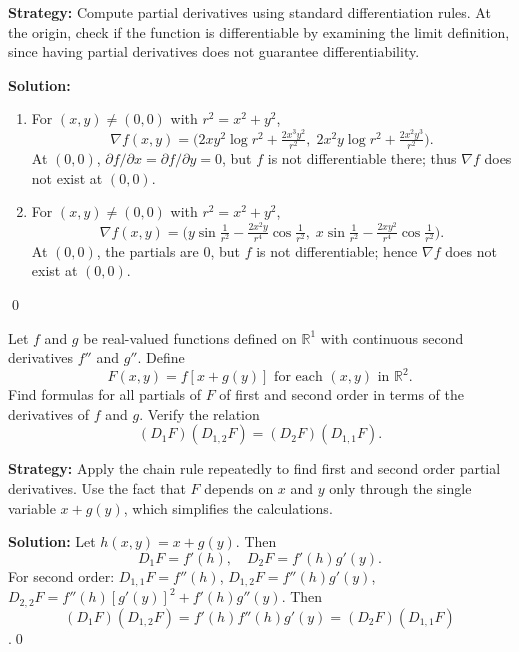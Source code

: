\noindent\textbf{Strategy:} Compute partial derivatives using standard differentiation rules. At the origin, check if the function is differentiable by examining the limit definition, since having partial derivatives does not guarantee differentiability.

\bigskip\noindent\textbf{Solution:}
\begin{enumerate}[label=(\alph*)]
\item For $(x,y)\ne(0,0)$ with $r^2=x^2+y^2$,
\[\nabla f(x,y)=\big(2xy^2\log r^2+\tfrac{2x^3y^2}{r^2},\;2x^2y\log r^2+\tfrac{2x^2y^3}{r^2}\big).\]
At $(0,0)$, $\partial f/\partial x=\partial f/\partial y=0$, but $f$ is not differentiable there; thus $\nabla f$ does not exist at $(0,0)$.
\item For $(x,y)\ne(0,0)$ with $r^2=x^2+y^2$,
\[\nabla f(x,y)=\big(y\sin\tfrac{1}{r^2}-\tfrac{2x^2y}{r^4}\cos\tfrac{1}{r^2},\;x\sin\tfrac{1}{r^2}-\tfrac{2xy^2}{r^4}\cos\tfrac{1}{r^2}\big).\]
At $(0,0)$, the partials are $0$, but $f$ is not differentiable; hence $\nabla f$ does not exist at $(0,0)$.
\end{enumerate}\qed


\begin{problembox}
\begin{problemstatement}
Let \( f \) and \( g \) be real-valued functions defined on \( \mathbb{R}^1 \) with continuous second derivatives \( f'' \) and \( g'' \). Define
\[F(x, y) = f[x + g(y)] \text{ for each } (x, y) \text{ in } \mathbb{R}^2.\]
Find formulas for all partials of \( F \) of first and second order in terms of the derivatives of \( f \) and \( g \). Verify the relation
\[(D_1F)(D_{1,2}F) = (D_2F)(D_{1,1}F).\]
\end{problemstatement}
\end{problembox}

\noindent\textbf{Strategy:} Apply the chain rule repeatedly to find first and second order partial derivatives. Use the fact that \( F \) depends on \( x \) and \( y \) only through the single variable \( x + g(y) \), which simplifies the calculations.

\bigskip\noindent\textbf{Solution:}
Let $h(x,y)=x+g(y)$. Then 
\[D_1F=f'(h),\quad D_2F=f'(h)g'(y).\] 
For second order: 
$D_{1,1}F=f''(h)$, $D_{1,2}F=f''(h)g'(y)$, $D_{2,2}F=f''(h)[g'(y)]^2+f'(h)g''(y)$. Then $$(D_1F)(D_{1,2}F)=f'(h)f''(h)g'(y)=(D_2F)(D_{1,1}F)$$.\qed


